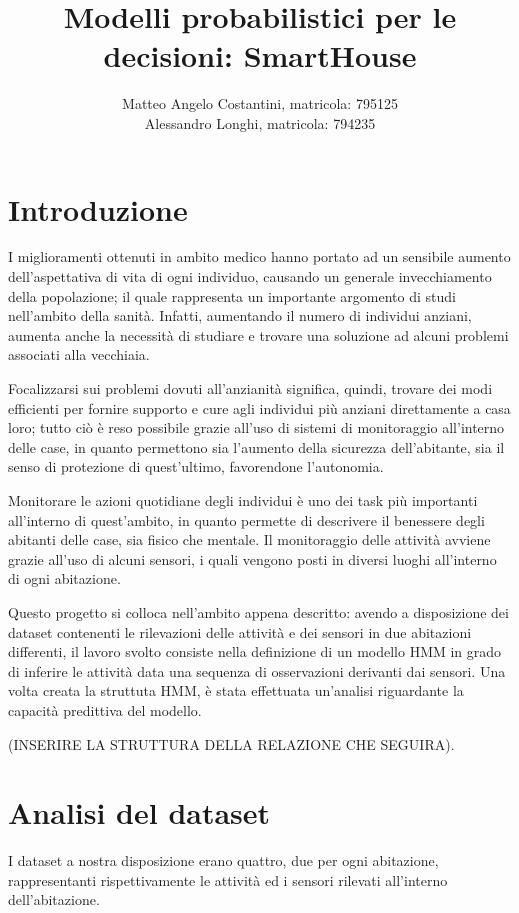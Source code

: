 \documentclass[10pt,a4paper]{article}
\title{Modelli probabilistici per le decisioni: SmartHouse}
\author{Matteo Angelo Costantini, matricola: 795125 \\
	Alessandro Longhi, matricola: 794235}
\date{}
\begin{document}
\maketitle
\clearpage
\tableofcontents
\clearpage
\section{Introduzione}
I miglioramenti ottenuti in ambito medico hanno portato ad un sensibile aumento dell'aspettativa di vita di ogni individuo, causando un generale invecchiamento della popolazione; il quale rappresenta un importante argomento di studi nell'ambito della sanità. Infatti, aumentando il numero di individui anziani, aumenta anche la necessità di studiare e trovare una soluzione ad alcuni problemi associati alla vecchiaia.

Focalizzarsi sui problemi dovuti all'anzianità significa, quindi, trovare dei modi efficienti per fornire supporto e cure agli individui più anziani direttamente a casa loro; tutto ciò è reso possibile grazie all'uso di sistemi di monitoraggio all'interno delle case, in quanto permettono sia l'aumento della sicurezza dell'abitante, sia il senso di protezione di quest'ultimo, favorendone l'autonomia.

Monitorare le azioni quotidiane degli individui è uno dei task più importanti all'interno di quest'ambito, in quanto permette di descrivere il benessere degli abitanti delle case, sia fisico che mentale. Il monitoraggio delle attività avviene grazie all'uso di alcuni sensori, i quali vengono posti in diversi luoghi all'interno di ogni abitazione. 

Questo progetto si colloca nell'ambito appena descritto: avendo a disposizione dei dataset contenenti le rilevazioni delle attività e dei sensori in due abitazioni differenti, il lavoro svolto consiste nella definizione di un modello HMM in grado di inferire le attività data una sequenza di osservazioni derivanti dai sensori. Una volta creata la struttuta HMM, è stata effettuata un'analisi riguardante la capacità predittiva del modello.

(INSERIRE LA STRUTTURA DELLA RELAZIONE CHE SEGUIRA). 


\clearpage
\section{Analisi del dataset}
I dataset a nostra disposizione erano quattro, due per ogni abitazione, rappresentanti rispettivamente le attività ed i sensori rilevati all'interno dell'abitazione.
\end{document}
